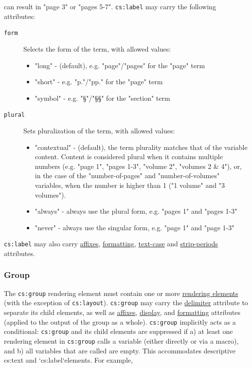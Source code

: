 can result in "page 3" or "pages 5-7". \texttt{cs:label} may carry the
following attributes:

\begin{description}
\item[\texttt{form}]
Selects the form of the term, with allowed values:

\begin{itemize}
\tightlist
\item
  "long" - (default), e.g. "page"/"pages" for the "page" term
\item
  "short" - e.g. "p."/"pp." for the "page" term
\item
  "symbol" - e.g. "§"/"§§" for the "section" term
\end{itemize}
\item[\texttt{plural}]
Sets pluralization of the term, with allowed values:

\begin{itemize}
\tightlist
\item
  "contextual" - (default), the term plurality matches that of the
  variable content. Content is considered plural when it contains
  multiple numbers (e.g. "page 1", "pages 1-3", "volume 2", "volumes 2
  \& 4"), or, in the case of the "number-of-pages" and
  "number-of-volumes" variables, when the number is higher than 1 ("1
  volume" and "3 volumes").
\item
  "always" - always use the plural form, e.g. "pages 1" and "pages 1-3"
\item
  "never" - always use the singular form, e.g. "page 1" and "page 1-3"
\end{itemize}
\end{description}

\texttt{cs:label} may also carry \protect\hyperlink{affixes}{affixes},
\protect\hyperlink{formatting}{formatting},
\protect\hyperlink{text-case}{text-case} and
\protect\hyperlink{strip-periods}{strip-periods} attributes.

\hypertarget{group}{%
\subsubsection{Group}\label{group}}

The \texttt{cs:group} rendering element must contain one or more
\protect\hyperlink{rendering-elements}{rendering elements} (with the
exception of \texttt{cs:layout}). \texttt{cs:group} may carry the
\protect\hyperlink{delimiter}{delimiter} attribute to separate its child
elements, as well as \protect\hyperlink{affixes}{affixes},
\protect\hyperlink{display}{display}, and
\protect\hyperlink{formatting}{formatting} attributes (applied to the
output of the group as a whole). \texttt{cs:group} implicitly acts as a
conditional: \texttt{cs:group} and its child elements are suppressed if
a) at least one rendering element in \texttt{cs:group} calls a variable
(either directly or via a macro), and b) all variables that are called
are empty. This accommodates descriptive {cs:text} and
`cs:label`elements. For example,


